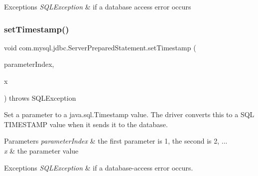 \begin{DoxyExceptions}{Exceptions}
{\em S\+Q\+L\+Exception} & if a database access error occurs \\
\hline
\end{DoxyExceptions}
\mbox{\label{classcom_1_1mysql_1_1jdbc_1_1_server_prepared_statement_a252954de3d685bbc24d5822f98793e37}} 
\subsubsection{\texorpdfstring{set\+Timestamp()}{setTimestamp()}\hspace{0.1cm}{\footnotesize\ttfamily [1/2]}}
{\footnotesize\ttfamily void com.\+mysql.\+jdbc.\+Server\+Prepared\+Statement.\+set\+Timestamp (\begin{DoxyParamCaption}\item[{int}]{parameter\+Index,  }\item[{java.\+sql.\+Timestamp}]{x }\end{DoxyParamCaption}) throws S\+Q\+L\+Exception}

Set a parameter to a java.\+sql.\+Timestamp value. The driver converts this to a S\+QL T\+I\+M\+E\+S\+T\+A\+MP value when it sends it to the database.


\begin{DoxyParams}{Parameters}
{\em parameter\+Index} & the first parameter is 1, the second is 2, ... \\
\hline
{\em x} & the parameter value\\
\hline
\end{DoxyParams}

\begin{DoxyExceptions}{Exceptions}
{\em S\+Q\+L\+Exception} & if a database-\/access error occurs. \\
\hline
\end{DoxyExceptions}
\mbox{\label{classcom_1_1mysql_1_1jdbc_1_1_server_prepared_statement_af767678f3827282895f28e7009c1c524}} 
